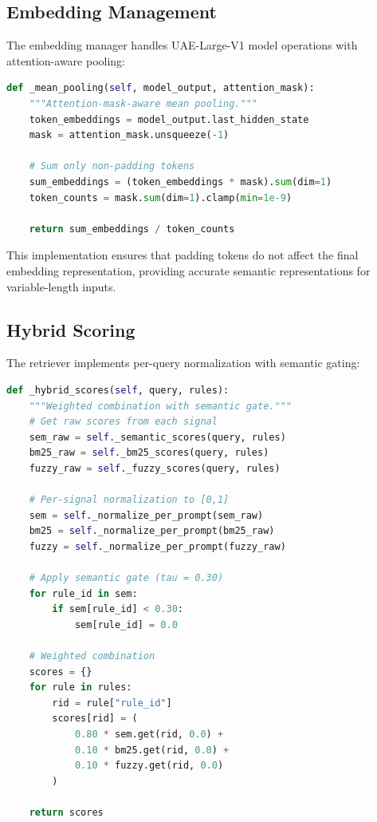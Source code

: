 \subsection{Embedding Management}

The embedding manager handles UAE-Large-V1 model operations with attention-aware pooling:

\begin{lstlisting}[language=Python, caption={Mean pooling implementation for embeddings}, label={lst:mean-pooling}]
def _mean_pooling(self, model_output, attention_mask):
    """Attention-mask-aware mean pooling."""
    token_embeddings = model_output.last_hidden_state
    mask = attention_mask.unsqueeze(-1)
    
    # Sum only non-padding tokens
    sum_embeddings = (token_embeddings * mask).sum(dim=1)
    token_counts = mask.sum(dim=1).clamp(min=1e-9)
    
    return sum_embeddings / token_counts
\end{lstlisting}

This implementation ensures that padding tokens do not affect the final embedding representation, providing accurate semantic representations for variable-length inputs.

\subsection{Hybrid Scoring}

The retriever implements per-query normalization with semantic gating:

\begin{lstlisting}[language=Python, caption={Hybrid score computation with semantic gate}, label={lst:hybrid-scoring}]
def _hybrid_scores(self, query, rules):
    """Weighted combination with semantic gate."""
    # Get raw scores from each signal
    sem_raw = self._semantic_scores(query, rules)
    bm25_raw = self._bm25_scores(query, rules)
    fuzzy_raw = self._fuzzy_scores(query, rules)
    
    # Per-signal normalization to [0,1]
    sem = self._normalize_per_prompt(sem_raw)
    bm25 = self._normalize_per_prompt(bm25_raw)
    fuzzy = self._normalize_per_prompt(fuzzy_raw)
    
    # Apply semantic gate (tau = 0.30)
    for rule_id in sem:
        if sem[rule_id] < 0.30:
            sem[rule_id] = 0.0
    
    # Weighted combination
    scores = {}
    for rule in rules:
        rid = rule["rule_id"]
        scores[rid] = (
            0.80 * sem.get(rid, 0.0) +
            0.10 * bm25.get(rid, 0.0) +
            0.10 * fuzzy.get(rid, 0.0)
        )
    
    return scores
\end{lstlisting}

